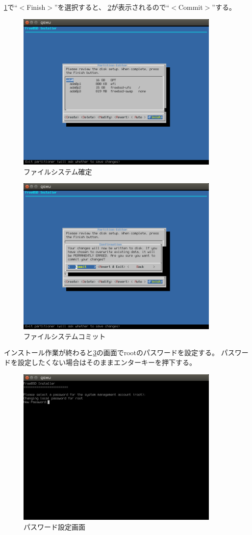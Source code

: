 \documentclass[a4j]{jarticle}
\begin{document}
\ref{fig:FreeBSD_FileSYstem_fin}で``$<$Finish$>$''を選択すると、
\ref{fig:FreeBSD_FileSYstem_com}が表示されるので``$<$Commit$>$''する。
\begin{figure}[htbp]
	\centering
	\includegraphics[width=10cm]{./IMG/FreeBSD_PT_FIX.png}
    \caption{ファイルシステム確定}
    \label{fig:FreeBSD_FileSYstem_fin}
\end{figure}
\begin{figure}[htbp]
	\centering
	\includegraphics[width=10cm]{./IMG/FreeBSD_COMMIT.png}
    \caption{ファイルシステムコミット}
    \label{fig:FreeBSD_FileSYstem_com}
\end{figure}

インストール作業が終わると\ref{fig:FreeBSD_PASS}の画面でrootのパスワードを設定する。
パスワードを設定したくない場合はそのままエンターキーを押下する。
\begin{figure}[htbp]
	\centering
	\includegraphics[width=10cm]{./IMG/FreeBSD_ROOT_PASS.png}
    \caption{パスワード設定画面}
    \label{fig:FreeBSD_PASS}
\end{figure}
\end{document}
